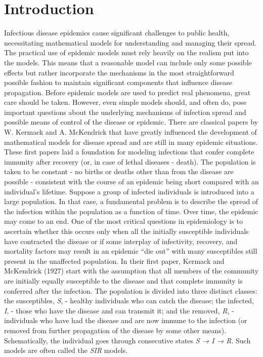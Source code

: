 \section{Introduction}\label{Introduction}\thispagestyle{SectionFirstPage} %
\hspace{\parindent} Infectious disease epidemics cause significant challenges to public health, necessitating mathematical models for understanding and managing their spread.
The practical use of epidemic models must rely heavily on the realism put into the models.
This means that a reasonable model can include only some possible effects but rather incorporate the mechanisms in the most straightforward possible fashion to maintain significant components that influence disease propagation.
Before epidemic models are used to predict real phenomena, great care should be taken.
However, even simple models should, and often do, pose important questions about the underlying mechanisms of infection spread and possible means of control of the disease or epidemic.
There are classical papers by W. Kermack and A. McKendrick \cite{Kermack} that have greatly influenced the development of mathematical models for disease spread and are still in many epidemic situations.
These first papers laid a foundation for modeling infections that confer complete immunity after recovery (or, in case of lethal diseases - death).
The population is taken to be constant - no births or deaths other than from the disease are possible - consistent with the course of an epidemic being short compared with an individual's lifetime.
Suppose a group of infected individuals is introduced into a large population. In that case, a fundamental problem is to describe the spread of the infection within the population as a function of time.
Over time, the epidemic may come to an end.
One of the most critical questions in epidemiology is to ascertain whether this occurs only when all the initially susceptible individuals have contracted the disease or if some interplay of infectivity, recovery, and mortality factors may result in an epidemic “die out” with many susceptibles still present in the unaffected population.
In their first paper, Kermack and McKendrick (1927) start with the assumption that all members of the community are initially equally susceptible to the disease and that complete immunity is conferred after the infection.
The population is divided into three distinct classes: the susceptibles, \textit{S}, - healthy individuals who can catch the disease; the infected, \textit{I}, - those who have the disease and can transmit it; and the removed, \textit{R}, - individuals who have had the disease and are now immune to the infection (or removed from further propagation of the disease by some other means).
Schematically, the individual goes through consecutive states \textit{S → I → R}.
Such models are often called the \textit{SIR} models.
